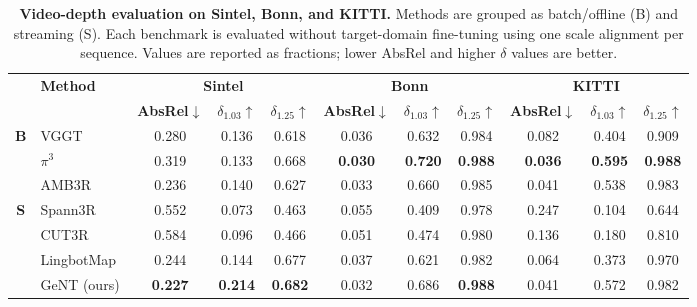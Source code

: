 \begin{table}[!t]
    \centering
    \caption{\textbf{Video-depth evaluation on Sintel, Bonn, and KITTI.}
    Methods are grouped as batch/offline (B) and streaming (S).
    Each benchmark is evaluated without target-domain fine-tuning using one scale alignment per sequence.
    Values are reported as fractions; lower AbsRel and higher $\delta$ values are better.}
    \label{tab:geont_video_depth_eval}
    \scriptsize
    \setlength{\tabcolsep}{2.5pt}
    \renewcommand{\arraystretch}{1.15}
    \begin{tabular*}{\textwidth}{@{\extracolsep{\fill}}clccccccccc@{}}
        \toprule
        & \textbf{Method} & \multicolumn{3}{c}{\textbf{Sintel}} & \multicolumn{3}{c}{\textbf{Bonn}} & \multicolumn{3}{c}{\textbf{KITTI}} \\
        \cmidrule(lr){3-5} \cmidrule(lr){6-8} \cmidrule(lr){9-11}
        & & \textbf{AbsRel}$\downarrow$ & \textbf{$\delta_{1.03}$}$\uparrow$ & \textbf{$\delta_{1.25}$}$\uparrow$
        & \textbf{AbsRel}$\downarrow$ & \textbf{$\delta_{1.03}$}$\uparrow$ & \textbf{$\delta_{1.25}$}$\uparrow$
        & \textbf{AbsRel}$\downarrow$ & \textbf{$\delta_{1.03}$}$\uparrow$ & \textbf{$\delta_{1.25}$}$\uparrow$ \\
        \midrule
        \multirow{3}{*}{\textbf{B}} & VGGT~\cite{wang2025vggt} & 0.280 & 0.136 & 0.618 & 0.036 & 0.632 & 0.984 & 0.082 & 0.404 & 0.909 \\
        & $\pi^{3}$~\cite{wang2026pi} & 0.319 & 0.133 & 0.668 & \cellcolor{red!25}\textbf{0.030} & \cellcolor{red!25}\textbf{0.720} & \cellcolor{red!25}\textbf{0.988} & \cellcolor{red!25}\textbf{0.036} & \cellcolor{red!25}\textbf{0.595} & \cellcolor{red!25}\textbf{0.988} \\
        & AMB3R~\cite{wang2025amb3r} & \cellcolor{yellow!25}0.236 & 0.140 & 0.627 & 0.033 & 0.660 & \cellcolor{yellow!25}0.985 & \cellcolor{yellow!25}0.041 & 0.538 & \cellcolor{yellow!25}0.983 \\
        \midrule
        \multirow{4}{*}{\textbf{S}} & Spann3R~\cite{wang20253d} & 0.552 & 0.073 & 0.463 & 0.055 & 0.409 & 0.978 & 0.247 & 0.104 & 0.644 \\
        & CUT3R~\cite{wang2025continuous} & 0.584 & 0.096 & 0.466 & 0.051 & 0.474 & 0.980 & 0.136 & 0.180 & 0.810 \\
        & LingbotMap~\cite{chen2026geometric} & 0.244 & \cellcolor{yellow!25}0.144 & \cellcolor{yellow!25}0.677 & 0.037 & 0.621 & 0.982 & 0.064 & 0.373 & 0.970 \\
        & GeNT (ours) & \cellcolor{red!25}\textbf{0.227} & \cellcolor{red!25}\textbf{0.214} & \cellcolor{red!25}\textbf{0.682} & \cellcolor{yellow!25}0.032 & \cellcolor{yellow!25}0.686 & \cellcolor{red!25}\textbf{0.988} & \cellcolor{yellow!25}0.041 & \cellcolor{yellow!25}0.572 & 0.982 \\
        \bottomrule
    \end{tabular*}
\end{table}

